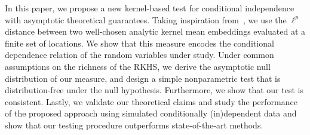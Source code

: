 


In this paper, we propose a new kernel-based test for conditional independence with asymptotic theoretical guarantees.
Taking inspiration from~\cite{chwialkowski2015fast,jitkrittum2017adaptive,NEURIPS2019_0e2db0cb}, we use the $\ell^p$ distance between two well-chosen analytic kernel mean embeddings evaluated at a finite set of locations. We show that this measure encodes the conditional dependence relation of the random
variables under study. 
Under common assumptions on the richness of the RKHS, we derive the asymptotic null distribution of our measure, and design a simple nonparametric test that is distribution-free under the null hypothesis. Furthermore, we show that our test is consistent. Lastly, we validate our theoretical claims and study the performance of the proposed approach using simulated conditionally (in)dependent data and show that our testing procedure outperforms state-of-the-art methods.


